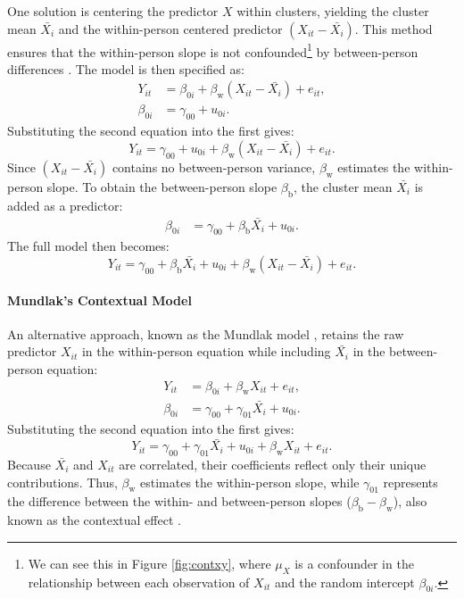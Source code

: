 \documentclass[stu]{apa7}
\begin{document}
One solution is centering the predictor $X$ within clusters, yielding the cluster mean $\bar{X_i}$ and the within-person centered predictor $(X_{it} - \bar{X_i})$. This method ensures that the within-person slope is not confounded\footnote{We can see this in Figure \ref{fig:contxy}, where $\mu_X$ is a confounder in the relationship between each observation of $X_{it}$ and the random intercept $\beta_{0i}$.} by between-person differences \parencite[e.g.,][]{hoffman_longitudinal_2015, kreft_effect_1995, raudenbush_hierarchical_2002}. The model is then specified as:
\begin{align}
Y_{it} &= \beta_{0i} + \beta_\text{w} (X_{it}- \bar{X_i}) + e_{it},  \\
\beta_{0i} &= \gamma_{00} + u_{0i}.
\end{align}
Substituting the second equation into the first gives:
\begin{equation}
Y_{it} = \gamma_{00} + u_{0i} + \beta_\text{w} (X_{it}- \bar{X_i}) + e_{it}.
\end{equation}
Since $(X_{it} - \bar{X_i})$ contains no between-person variance, $\beta_\text{w}$ estimates the within-person slope. To obtain the between-person slope $\beta_\text{b}$, the cluster mean $\bar{X_i}$ is added as a predictor:
\begin{align}
\beta_{0i} &= \gamma_{00} + \beta_\text{b} \bar{X_i} + u_{0i}.
\end{align}
The full model then becomes:
\begin{equation}
Y_{it} = \gamma_{00} + \beta_\text{b} \bar{X_i} + u_{0i} + \beta_\text{w} (X_{it} - \bar{X_i}) + e_{it}.
\end{equation}
\paragraph{Mundlak's Contextual Model}

An alternative approach, known as the Mundlak model \parencite{mundlak_pooling_1978}, retains the raw predictor $X_{it}$ in the within-person equation while including $\bar{X_i}$ in the between-person equation:
\begin{align}
Y_{it} &= \beta_{0i} + \beta_\text{w} X_{it} + e_{it}, \\
\beta_{0i} &= \gamma_{00} + \gamma_{01} \bar{X_i} + u_{0i}.
\end{align}
Substituting the second equation into the first gives:
\begin{equation}
Y_{it} = \gamma_{00} + \gamma_{01} \bar{X_i} + u_{0i} + \beta_\text{w} X_{it} + e_{it}.
\end{equation}
Because $\bar{X_i}$ and $X_{it}$ are correlated, their coefficients reflect only their unique contributions. Thus, $\beta_\text{w}$ estimates the within-person slope, while $\gamma_{01}$ represents the difference between the within- and between-person slopes ($\beta_\text{b} - \beta_\text{w}$), also known as the contextual effect \parencite{hoffman_longitudinal_2015, raudenbush_hierarchical_2002}.
\end{document}
